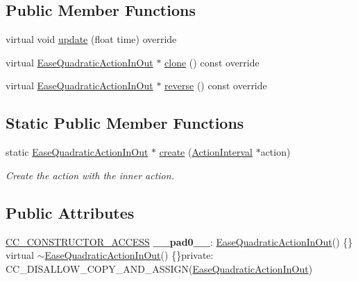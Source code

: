 \subsection*{Public Member Functions}
\begin{DoxyCompactItemize}
\item 
virtual void \hyperlink{classEaseQuadraticActionInOut_ac72e1da241d156a748cf02d5cb8e72c1}{update} (float time) override
\item 
virtual \hyperlink{classEaseQuadraticActionInOut}{Ease\+Quadratic\+Action\+In\+Out} $\ast$ \hyperlink{classEaseQuadraticActionInOut_a0cb4186dee46962ef6e801288c199a53}{clone} () const override
\item 
virtual \hyperlink{classEaseQuadraticActionInOut}{Ease\+Quadratic\+Action\+In\+Out} $\ast$ \hyperlink{classEaseQuadraticActionInOut_ab77788315a86df25eb5760c4a0970828}{reverse} () const override
\end{DoxyCompactItemize}
\subsection*{Static Public Member Functions}
\begin{DoxyCompactItemize}
\item 
static \hyperlink{classEaseQuadraticActionInOut}{Ease\+Quadratic\+Action\+In\+Out} $\ast$ \hyperlink{classEaseQuadraticActionInOut_a96b043286d05fb22b64fa6a4620b73ef}{create} (\hyperlink{classActionInterval}{Action\+Interval} $\ast$action)
\begin{DoxyCompactList}\small\item\em Create the action with the inner action. \end{DoxyCompactList}\end{DoxyCompactItemize}
\subsection*{Public Attributes}
\begin{DoxyCompactItemize}
\item 
\mbox{\label{classEaseQuadraticActionInOut_a95f75f70b02a972d556d492c348b3f08}} 
\hyperlink{_2cocos2d_2cocos_2base_2ccConfig_8h_a25ef1314f97c35a2ed3d029b0ead6da0}{C\+C\+\_\+\+C\+O\+N\+S\+T\+R\+U\+C\+T\+O\+R\+\_\+\+A\+C\+C\+E\+SS} {\bfseries \+\_\+\+\_\+pad0\+\_\+\+\_\+}\+: \hyperlink{classEaseQuadraticActionInOut}{Ease\+Quadratic\+Action\+In\+Out}() \{\} virtual $\sim$\hyperlink{classEaseQuadraticActionInOut}{Ease\+Quadratic\+Action\+In\+Out}() \{\}private\+: C\+C\+\_\+\+D\+I\+S\+A\+L\+L\+O\+W\+\_\+\+C\+O\+P\+Y\+\_\+\+A\+N\+D\+\_\+\+A\+S\+S\+I\+GN(\hyperlink{classEaseQuadraticActionInOut}{Ease\+Quadratic\+Action\+In\+Out})
\end{DoxyCompactItemize}
